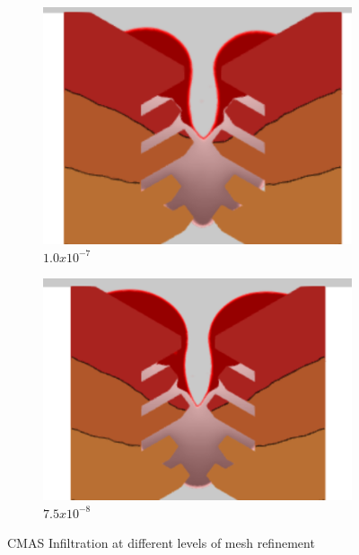 \documentclass[conf]{new-aiaa}
\begin{document}
\begin{figure}[htp!]
    \begin{subfigure}{0.5\textwidth}
        \centering
        \includegraphics[scale=0.75]{Figures/finerMesh.png}
        \caption{$1.0x10^{-7}$}
        \label{fig:mesh-c}
    \end{subfigure}
    \begin{subfigure}{0.5\textwidth}
        \centering
        \includegraphics[scale=0.75]{Figures/finestMesh.png}
        \caption{$7.5x10^{-8}$}
        \label{fig:mesh-d}
    \end{subfigure}
    \caption{CMAS Infiltration at different levels of mesh refinement}
    \label{fig:mesh-refine}
\end{figure}
\end{document}
